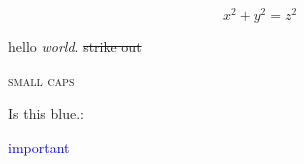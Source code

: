 \documentclass{article}
\begin{document}
$$
x^2 + y^2 = z^2
$$
%


hello \emph{world}.
\sout{strike out}

\textsc{small caps}

\color{blue}   Is this blue.:   

\textcolor{blue}{important}
\end{document}

